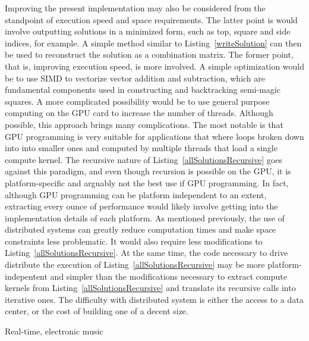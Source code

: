 Improving the present implementation may also be considered from the standpoint of execution speed and space requirements. The latter point is would involve outputting solutions in a minimized form, such as top, square and side indices, for example. A simple method similar to Listing~\ref{writeSolution} can then be used to reconstruct the solution as a combination matrix. The former point, that is, improving execution speed, is more involved. A simple optimization would be to use SIMD to vectorize vector addition and subtraction, which are fundamental components used in constructing and backtracking semi-magic squares. A more complicated possibility would be to use general purpose computing on the GPU card to increase the number of threads. Although possible, this approach brings many complications. The most notable is that GPU programming is very suitable for applications that where loops broken down into into smaller ones and computed by multiple threads that load a single compute kernel. The recursive nature of Listing~\ref{allSolutionsRecursive} goes against this paradigm, and even though recursion is possible on the GPU, it is platform-specific and arguably not the best use if GPU programming. In fact, although GPU programming can be platform independent to an extent, extracting every ounce of performance would likely involve getting into the implementation details of each platform. As mentioned previously, the use of distributed systems can greatly reduce computation times and make space constraints less problematic. It would also require less modifications to Listing~\ref{allSolutionsRecursive}. At the same time, the code necessary to drive distribute the execution of Listing~\ref{allSolutionsRecursive} may be more platform-indepentent and simpler than the modifications necessary to extract compute kernels from Listing~\ref{allSolutionsRecursive} and translate its recursive calls into iterative ones. The difficulty with distributed system is either the access to a data center, or the cost of building one of a decent size.

Real-time, electronic music
